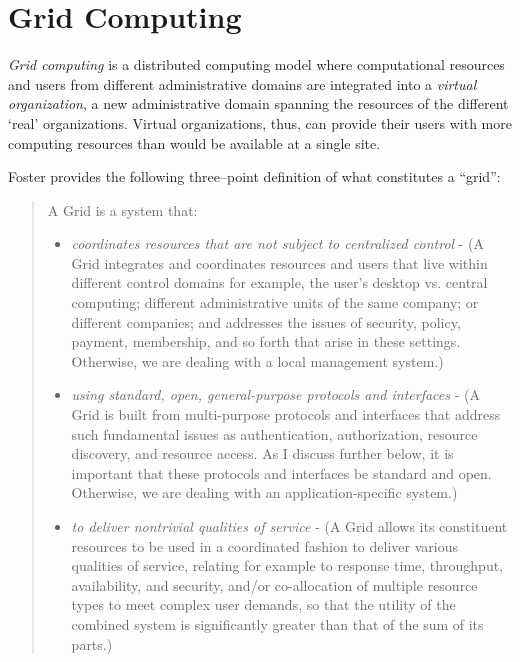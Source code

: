 \section{Grid Computing}
\label{sec:grid}

\emph{Grid computing} \cite{gridbook} is a distributed computing model where computational resources and users from different administrative domains are integrated into a \emph{virtual organization}, a new administrative domain spanning the resources of the different `real' organizations. Virtual organizations, thus, can provide their users with more computing resources than would be available at a single site.

Foster \cite{threepointgrid} provides the following three--point definition of what constitutes a ``grid'':

\begin{quote}
A Grid is a system that:
\begin{itemize}
\item \emph{coordinates resources that are not subject to centralized control} - (A Grid integrates and coordinates resources and users that live within different control domains for example, the user's desktop vs. central computing; different administrative units of the same company; or different companies; and addresses the issues of security, policy, payment, membership, and so forth that arise in these settings. Otherwise, we are dealing with a local management system.)
\item \emph{using standard, open, general-purpose protocols and interfaces} - (A Grid is built from multi-purpose protocols and interfaces that address such fundamental issues as authentication, authorization, resource discovery, and resource access. As I discuss further below, it is important that these protocols and interfaces be standard and open. Otherwise, we are dealing with an application-specific system.)
\item \emph{to deliver nontrivial qualities of service} - (A Grid allows its constituent resources to be used in a coordinated fashion to deliver various qualities of service, relating for example to response time, throughput, availability, and security, and/or co-allocation of multiple resource types to meet complex user demands, so that the utility of the combined system is significantly greater than that of the sum of its parts.)
\end{itemize}
\end{quote} 

